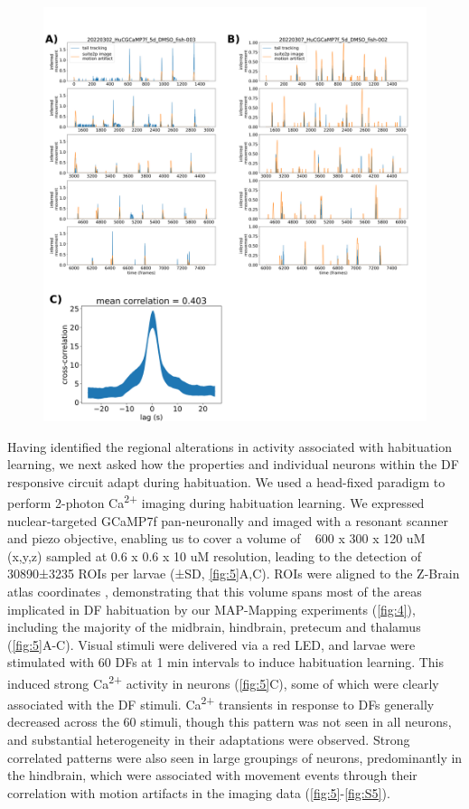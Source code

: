 \documentclass[9pt,lineno]{RandlettLab_elife}
\begin{document}
\begin{figure}
\begin{fullwidth}
\begin{center}
{}{\includegraphics[width=14cm]{FigureS2_MotionAnalysis.png}}
\label{fig:S5}
\end{center}
\end{fullwidth}
\end{figure}

Having identified the regional alterations in activity associated with habituation learning, we next asked how the properties and individual neurons within the DF responsive circuit adapt during habituation. We used a head-fixed paradigm to perform 2-photon Ca\textsuperscript{2+} imaging during habituation learning. We expressed nuclear-targeted GCaMP7f pan-neuronally and imaged with a resonant scanner and piezo objective, enabling us to cover a volume of ~ 600 x 300 x 120 uM (x,y,z) sampled at 0.6 x 0.6 x 10 uM resolution, leading to the detection of 30890±3235 ROIs per larvae (±SD, \autoref{fig:5}A,C). ROIs were aligned to the Z-Brain atlas coordinates \cite{Randlett2015-hy}, demonstrating that this volume spans most of the areas implicated in DF habituation by our MAP-Mapping experiments (\autoref{fig:4}), including the majority of the midbrain, hindbrain, pretecum and thalamus (\autoref{fig:5}A-C). Visual stimuli were delivered via a red LED, and larvae were stimulated with 60 DFs at 1 min intervals to induce habituation learning. This induced strong Ca\textsuperscript{2+} activity in neurons (\autoref{fig:5}C), some of which were clearly associated with the DF stimuli. Ca\textsuperscript{2+} transients in response to DFs generally decreased across the 60 stimuli, though this pattern was not seen in all neurons, and substantial heterogeneity in their adaptations were observed. Strong correlated patterns were also seen in large groupings of neurons, predominantly in the hindbrain, which were associated with movement events through their correlation with motion artifacts in the imaging data (\autoref{fig:5}-\autoref{fig:S5}). 
\end{document}
